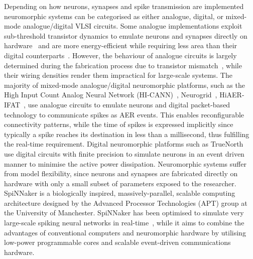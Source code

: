 \documentclass{frontiersENG} %
\begin{document}
Depending on how neurons, synapses and spike transmission are implemented neuromorphic systems can be categorised as either analogue, digital, or mixed-mode analogue/digital VLSI circuits. Some analogue implementations exploit sub-threshold transistor dynamics to emulate neurons and synapses directly on hardware~\citep{indiveri2011neuromorphic} and are more energy-efficient while requiring less area than their digital counterparts~\citep{joubert2012hardware}. However, the behaviour of analogue circuits is largely determined during the fabrication process due to transistor mismatch~\citep{indiveri2011neuromorphic,pedram2006thermal,linares2003compact}, while their wiring densities render them impractical for large-scale systems. The majority of mixed-mode analogue/digital neuromorphic platforms, such as the High Input Count Analog Neural Network (HI-CANN)~\citep{schemmel2010wafer}, Neurogrid~\citep{benjamin2014neurogrid}, HiAER-IFAT~\citep{yu201265k}, use analogue circuits to emulate neurons and digital packet-based technology to communicate spikes as AER events. This enables reconfigurable connectivity patterns, while the time of spikes is expressed implicitly since typically a spike reaches its destination in less than a millisecond, thus fulfilling the real-time requirement. Digital neuromorphic platforms such as TrueNorth~\citep{merolla2014million} use digital circuits with finite precision to simulate neurons in an event driven manner to minimise the active power dissipation. Neuromorphic systems suffer from model flexibility, since neurons and synapses are fabricated directly on hardware with only a small subset of parameters exposed to the researcher. 
SpiNNaker is a biologically inspired, massively-parallel, scalable computing architecture designed by the Advanced Processor Technologies (APT) group at the University of Manchester. SpiNNaker has been optimised to simulate very large-scale spiking neural networks in real-time~\citep{furber2014spinnaker}, while it aims to combine the advantages of conventional computers and neuromorphic hardware by utilising low-power programmable cores and scalable event-driven communications hardware.
\end{document}
